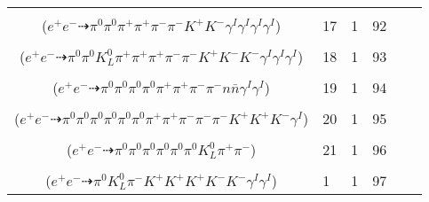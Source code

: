 \documentclass[landscape]{article}
\newcounter{rownumbers}
\newcommand\rn{\stepcounter{rownumbers}\arabic{rownumbers}}
\newcommand{\EOL}{\\} %
\newcommand{\topoTags}[1]{#1} %
\begin{document}
\begin{longtable}{clcccc}
\rn & \makecell[l]{ $ 
e^{+} e^{-} \rightarrow \pi^{0} \pi^{+} \pi^{-} \rho^{+} K^{*} K^{-} \gamma^{I} \gamma^{I} \gamma^{I} \gamma^{I} ,
\rho^{+} \rightarrow \pi^{0} \pi^{+} ,
K^{*} \rightarrow \pi^{-} K^{+} 
$ \\ ($
e^{+} e^{-} \dashrightarrow \pi^{0} \pi^{0} \pi^{+} \pi^{+} \pi^{-} \pi^{-} K^{+} K^{-} \gamma^{I} \gamma^{I} \gamma^{I} \gamma^{I} 
$) } & \topoTags{17 & }1 & 92 \EOL

\rn & \makecell[l]{ $ 
e^{+} e^{-} \rightarrow \pi^{0} \pi^{+} \pi^{+} \eta K^{0} K^{*} K^{-} K^{-} \gamma^{I} \gamma^{I} \gamma^{I} ,
\eta \rightarrow \pi^{0} \pi^{+} \pi^{-} ,
K^{0} \rightarrow K_{L}^{0} ,
K^{*} \rightarrow \pi^{-} K^{+} 
$ \\ ($
e^{+} e^{-} \dashrightarrow \pi^{0} \pi^{0} K_{L}^{0} \pi^{+} \pi^{+} \pi^{+} \pi^{-} \pi^{-} K^{+} K^{-} K^{-} \gamma^{I} \gamma^{I} \gamma^{I} 
$) } & \topoTags{18 & }1 & 93 \EOL

\rn & \makecell[l]{ $ 
e^{+} e^{-} \rightarrow \pi^{0} \pi^{-} \rho^{+} \rho^{+} \rho^{-} n \bar{n} \gamma^{I} \gamma^{I} ,
\rho^{+} \rightarrow \pi^{0} \pi^{+} ,
\rho^{+} \rightarrow \pi^{0} \pi^{+} ,
\rho^{-} \rightarrow \pi^{0} \pi^{-} 
$ \\ ($
e^{+} e^{-} \dashrightarrow \pi^{0} \pi^{0} \pi^{0} \pi^{0} \pi^{+} \pi^{+} \pi^{-} \pi^{-} n \bar{n} \gamma^{I} \gamma^{I} 
$) } & \topoTags{19 & }1 & 94 \EOL

\rn & \makecell[l]{ $ 
e^{+} e^{-} \rightarrow \pi^{0} \pi^{0} \pi^{0} \pi^{+} \pi^{-} \pi^{-} \pi^{-} \bar{K}^{0} \bar{K}^{*} K^{+} K^{+} \gamma^{I} ,
\bar{K}^{0} \rightarrow K_{L}^{0} ,
\bar{K}^{*} \rightarrow \pi^{+} K^{-} ,
K_{L}^{0} \rightarrow \pi^{0} \pi^{0} \pi^{0} 
$ \\ ($
e^{+} e^{-} \dashrightarrow \pi^{0} \pi^{0} \pi^{0} \pi^{0} \pi^{0} \pi^{0} \pi^{+} \pi^{+} \pi^{-} \pi^{-} \pi^{-} K^{+} K^{+} K^{-} \gamma^{I} 
$) } & \topoTags{20 & }1 & 95 \EOL

\rn & \makecell[l]{ $ 
e^{+} e^{-} \rightarrow \pi^{0} \pi^{0} \pi^{0} \omega K^{0} \bar{K}^{0} ,
\omega \rightarrow \pi^{0} \pi^{+} \pi^{-} ,
K^{0} \rightarrow K_{L}^{0} ,
\bar{K}^{0} \rightarrow K_{S}^{0} ,
K_{S}^{0} \rightarrow \pi^{0} \pi^{0} 
$ \\ ($
e^{+} e^{-} \dashrightarrow \pi^{0} \pi^{0} \pi^{0} \pi^{0} \pi^{0} \pi^{0} K_{L}^{0} \pi^{+} \pi^{-} 
$) } & \topoTags{21 & }1 & 96 \EOL

\rn & \makecell[l]{ $ 
e^{+} e^{-} \rightarrow \pi^{0} \bar{K}^{0} K^{*} K^{+} K^{-} \phi \gamma^{I} \gamma^{I} ,
\bar{K}^{0} \rightarrow K_{L}^{0} ,
K^{*} \rightarrow \pi^{-} K^{+} ,
\phi \rightarrow K^{+} K^{-} 
$ \\ ($
e^{+} e^{-} \dashrightarrow \pi^{0} K_{L}^{0} \pi^{-} K^{+} K^{+} K^{+} K^{-} K^{-} \gamma^{I} \gamma^{I} 
$) } & \topoTags{1 & }1 & 97 \EOL


\end{longtable}
\end{document}
